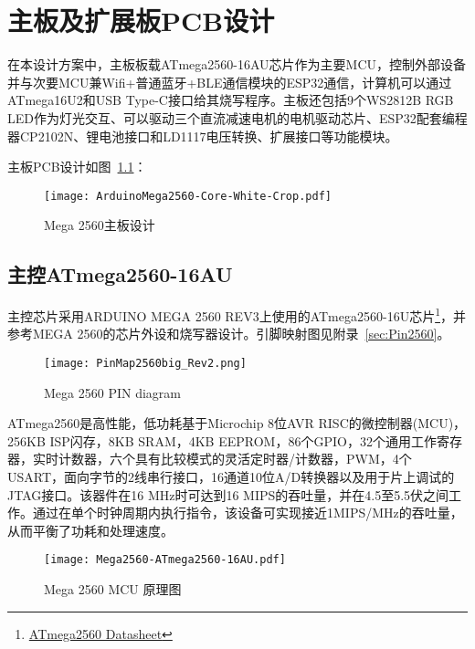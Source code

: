 \chapter{主板及扩展板PCB设计}
\label{cha:PCB}

在本设计方案中，主板板载ATmega2560-16AU芯片作为主要MCU，控制外部设备并与次要MCU兼Wifi+普通蓝牙+BLE通信模块的ESP32通信，计算机可以通过ATmega16U2和USB Type-C接口给其烧写程序。主板还包括9个WS2812B RGB LED作为灯光交互、可以驱动三个直流减速电机的电机驱动芯片、ESP32配套编程器CP2102N、锂电池接口和LD1117电压转换、扩展接口等功能模块。


主板PCB设计如图~\ref{fig:CorePCB}：

\begin{figure}[htbp]
    \centering
    \texttt{[image: ArduinoMega2560-Core-White-Crop.pdf]}
    \caption{Mega 2560主板设计}
    \label{fig:CorePCB}
\end{figure}

\section{主控ATmega2560-16AU}

主控芯片采用ARDUINO MEGA 2560 REV3\cite{arduino_mega-2560-r3}上使用的ATmega2560-16U芯片\footnote{\href{http://www.atmel.com/Images/Atmel-2549-8-bit-AVR-Microcontroller-ATmega640-1280-1281-2560-2561_datasheet.pdf}{ATmega2560 Datasheet}}，并参考MEGA 2560的芯片外设和烧写器设计。引脚映射图见附录~\ref{sec:Pin2560}。

\begin{figure}[htbp]
    \centering
    \texttt{[image: PinMap2560big\_Rev2.png]}
    \caption{Mega 2560 PIN diagram}
    \label{fig:PinMap2560}
\end{figure}

ATmega2560是高性能，低功耗基于Microchip 8位AVR RISC的微控制器(MCU)，256KB ISP闪存，8KB SRAM，4KB EEPROM，86个GPIO，32个通用工作寄存器，实时计数器，六个具有比较模式的灵活定时器/计数器，PWM，4个USART，面向字节的2线串行接口，16通道10位A/D转换器以及用于片上调试的JTAG接口。该器件在16 MHz时可达到16 MIPS的吞吐量，并在4.5至5.5伏之间工作。通过在单个时钟周期内执行指令，该设备可实现接近1MIPS/MHz的吞吐量，从而平衡了功耗和处理速度。

\begin{figure}[htbp]
    \centering
    \texttt{[image: Mega2560-ATmega2560-16AU.pdf]}
    \caption{Mega 2560 MCU 原理图}
    \label{fig:Mega2560-ATmega2560-16AU}
\end{figure}

